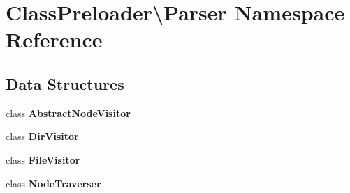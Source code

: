 \section{Class\+Preloader\textbackslash{}Parser Namespace Reference}
\label{namespace_class_preloader_1_1_parser}
\subsection*{Data Structures}
\begin{DoxyCompactItemize}
\item 
class {\bf Abstract\+Node\+Visitor}
\item 
class {\bf Dir\+Visitor}
\item 
class {\bf File\+Visitor}
\item 
class {\bf Node\+Traverser}
\end{DoxyCompactItemize}

